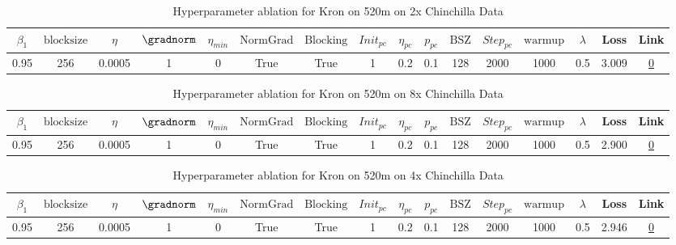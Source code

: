 \begin{table}[H]
\centering
\caption{Hyperparameter ablation for Kron on 520m on 2x Chinchilla Data}
\label{tab:ablation_kron_520m_2}
\begin{tabular}{cccccccccccccccc}
\toprule
$\beta_1$ & $\mathrm{block size}$ & $\eta$ & $\gradnorm$ & $\eta_{min}$ & $\mathrm{NormGrad}$ & $\mathrm{Blocking}$ & $Init_{pc}$ & $\eta_{pc}$ & $p_{pc}$ & $\mathrm{BSZ}$ & $Step_{pc}$ & $\mathrm{warmup}$ & $\lambda$ & Loss & Link \\
\midrule
0.95 & 256 & 0.0005 & 1 & 0 & True & True & 1 & 0.2 & 0.1 & 128 & 2000 & 1000 & 0.5 & 3.009 & \href{https://wandb.ai/stanford-mercury/optimizer-scaling/runs/sweep-520m-21B-krona6b124lr0.0005-wd0.5-b10.95-plr0.2-pis1-gn1-n-6acf07}{0} \\
\midrule
\bottomrule
\end{tabular}
\end{table}

\begin{table}[H]
\centering
\caption{Hyperparameter ablation for Kron on 520m on 8x Chinchilla Data}
\label{tab:ablation_kron_520m_8}
\begin{tabular}{cccccccccccccccc}
\toprule
$\beta_1$ & $\mathrm{block size}$ & $\eta$ & $\gradnorm$ & $\eta_{min}$ & $\mathrm{NormGrad}$ & $\mathrm{Blocking}$ & $Init_{pc}$ & $\eta_{pc}$ & $p_{pc}$ & $\mathrm{BSZ}$ & $Step_{pc}$ & $\mathrm{warmup}$ & $\lambda$ & Loss & Link \\
\midrule
0.95 & 256 & 0.0005 & 1 & 0 & True & True & 1 & 0.2 & 0.1 & 128 & 2000 & 1000 & 0.5 & 2.900 & \href{https://wandb.ai/stanford-mercury/optimizer-scaling/runs/sweep-520m-85B-kronc2a9f5lr0.0005-wd0.5-b10.95-plr0.2-pis1-gn1-n-7f654e}{0} \\
\midrule
\bottomrule
\end{tabular}
\end{table}

\begin{table}[H]
\centering
\caption{Hyperparameter ablation for Kron on 520m on 4x Chinchilla Data}
\label{tab:ablation_kron_520m_4}
\begin{tabular}{cccccccccccccccc}
\toprule
$\beta_1$ & $\mathrm{block size}$ & $\eta$ & $\gradnorm$ & $\eta_{min}$ & $\mathrm{NormGrad}$ & $\mathrm{Blocking}$ & $Init_{pc}$ & $\eta_{pc}$ & $p_{pc}$ & $\mathrm{BSZ}$ & $Step_{pc}$ & $\mathrm{warmup}$ & $\lambda$ & Loss & Link \\
\midrule
0.95 & 256 & 0.0005 & 1 & 0 & True & True & 1 & 0.2 & 0.1 & 128 & 2000 & 1000 & 0.5 & 2.946 & \href{https://wandb.ai/stanford-mercury/optimizer-scaling/runs/sweep-520m-42B-kronf21245lr0.0005-wd0.5-b10.95-plr0.2-pis1-gn1-n-e5e732}{0} \\
\midrule
\bottomrule
\end{tabular}
\end{table}


